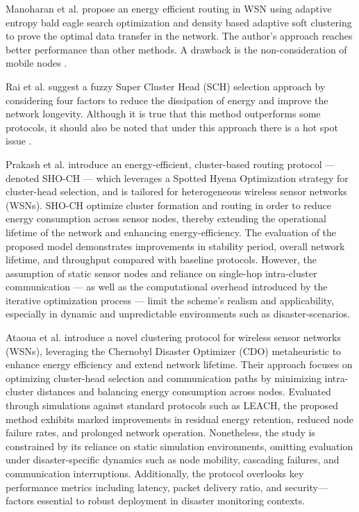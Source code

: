 Manoharan et al. \cite{manoharan_optimal_2024} propose an energy efficient routing in WSN using adaptive entropy bald eagle search optimization and density based adaptive soft clustering to prove the optimal data transfer in the network. The author’s approach reaches better performance than other methods. A drawback is the non-consideration of mobile nodes \cite{manoharan_optimal_2024}. 

Rai et al. \cite{rai_feec_2023} suggest a fuzzy Super Cluster Head (SCH) selection approach by considering four factors to reduce the dissipation of energy and improve the network longevity. Although it is true that this method outperforms some protocols, it should also be noted that under this approach there is a hot spot issue \cite{dinesh_hbo-sroa_2024}. 

Prakash et al. \cite{prakash2025enhanced} introduce an energy-efficient, cluster-based routing protocol — denoted SHO-CH — which leverages a Spotted Hyena Optimization strategy for cluster-head selection, and is tailored for heterogeneous wireless sensor networks (WSNs). SHO-CH optimize cluster formation and routing in order to reduce energy consumption across sensor nodes, thereby extending the operational lifetime of the network and enhancing energy-efficiency. The evaluation of the proposed model demonstrates improvements in stability period, overall network lifetime, and throughput compared with baseline protocols. However, the assumption of static sensor nodes and reliance on single-hop intra-cluster communication — as well as the computational overhead introduced by the iterative optimization process — limit the scheme’s realism and applicability, especially in dynamic and unpredictable environments such as disaster-scenarios. 

Ataoua et al. \cite{ataoua_chernobyl_2025} introduce a novel clustering protocol for wireless sensor networks (WSNs), leveraging the Chernobyl Disaster Optimizer (CDO) metaheuristic to enhance energy efficiency and extend network lifetime. Their approach focuses on optimizing cluster-head selection and communication paths by minimizing intra-cluster distances and balancing energy consumption across nodes. Evaluated through simulations against standard protocols such as LEACH, the proposed method exhibits marked improvements in residual energy retention, reduced node failure rates, and prolonged network operation. Nonetheless, the study is constrained by its reliance on static simulation environments, omitting evaluation under disaster-specific dynamics such as node mobility, cascading failures, and communication interruptions. Additionally, the protocol overlooks key performance metrics including latency, packet delivery ratio, and security—factors essential to robust deployment in disaster monitoring contexts.

